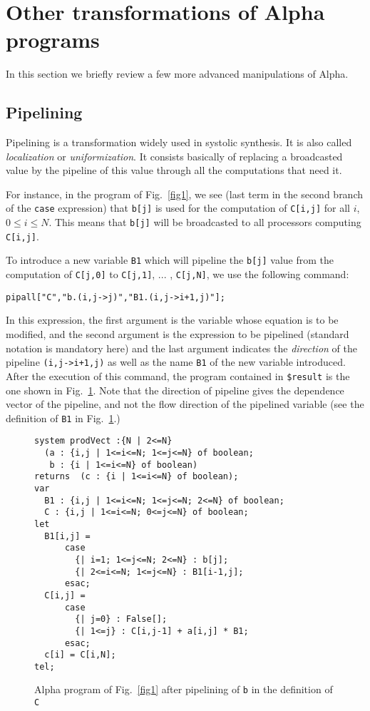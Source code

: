 \documentclass[12pt]{article}
\newcommand{\Alpha}{{\sc Alpha}}
\begin{document}
\section{Other transformations of {\Alpha} programs}
\label{advanced}

In this section we briefly review a few more advanced manipulations of
{\Alpha}. 

\subsection{Pipelining}
Pipelining is a transformation widely used in systolic synthesis.
It is also called {\em localization} or {\em uniformization}.
It consists basically of replacing a broadcasted value
by the pipeline of this value through all the computations that 
need it.  

For instance, in the program of Fig.~\ref{fig1}, we see (last 
term in the second branch of the {\tt case} expression) that 
{\tt b[j]} is used for the computation of {\tt C[i,j]} 
for all $i$, $0\leq i \leq N$. This means that \texttt{b[j]}
will be broadcasted to all processors computing \texttt{C[i,j]}.

To introduce a new variable {\tt B1} which will pipeline the {\tt b[j]} 
value from the computation of {\tt C[j,0]} to 
{\tt C[j,1]}, ... , {\tt C[j,N]}, we
use the following command:
\begin{verbatim}
pipall["C","b.(i,j->j)","B1.(i,j->i+1,j)"];
\end{verbatim}
In this expression, the first argument is the variable whose
equation is to be modified, and the second argument is the
expression to be pipelined (standard notation is mandatory here)
and the last argument indicates the {\em direction} of the pipeline
\texttt{(i,j->i+1,j)}
as well as the name \texttt{B1} of the new variable introduced. 
After the
execution of this command, the program contained in {\tt \$result} is
the one shown in Fig.~\ref{fig2}.
Note that the direction of pipeline gives the dependence vector of the
pipeline, and not the flow direction of the pipelined variable (see 
the definition of \texttt{B1} in Fig.~\ref{fig2}.)

\begin{figure}[ht]
\begin{verbatim}
system prodVect :{N | 2<=N}
  (a : {i,j | 1<=i<=N; 1<=j<=N} of boolean; 
   b : {i | 1<=i<=N} of boolean)
returns  (c : {i | 1<=i<=N} of boolean);
var
  B1 : {i,j | 1<=i<=N; 1<=j<=N; 2<=N} of boolean;
  C : {i,j | 1<=i<=N; 0<=j<=N} of boolean;
let
  B1[i,j] = 
      case
        {| i=1; 1<=j<=N; 2<=N} : b[j];
        {| 2<=i<=N; 1<=j<=N} : B1[i-1,j];
      esac;
  C[i,j] = 
      case
        {| j=0} : False[];
        {| 1<=j} : C[i,j-1] + a[i,j] * B1;
      esac;
  c[i] = C[i,N];
tel;
\end{verbatim}
\caption{{\Alpha} program of Fig.~\ref{fig1} after pipelining of {\tt b}
in the definition of \texttt{C}}
\label{fig2}
\end{figure}
\end{document}
